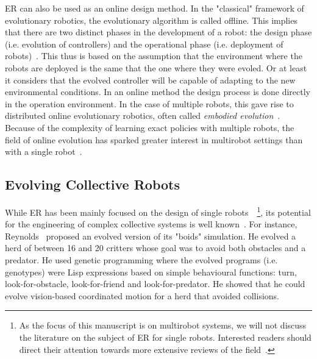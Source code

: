     ER can also be used as an online design method. In the "classical" framework of evolutionary robotics, the evolutionary algorithm is called offline. This implies that there are two distinct phases in the development of a robot: the design phase (i.e. evolution of controllers) and the operational phase (i.e. deployment of robots)~\parencite{Doncieux2015a, Francesca2016}. This thus is based on the assumption that the environment where the robots are deployed is the same that the one where they were evoled. Or at least it considers that the evolved controller will be capable of adapting to the new environmental conditions. In an online method the design process is done directly in the operation environment. In the case of multiple robots, this gave rise to distributed online evolutionary robotics, often called \emph{embodied evolution}~\parencite{Ficici1999, Watson2002}. Because of the complexity of learning exact policies with multiple robots, the field of online evolution has sparked greater interest in multirobot settings than with a single robot~\parencite{Doncieux2015a}.


  \subsection{Evolving Collective Robots}

    While ER has been mainly focused on the design of single robots~\parencite{Nolfi2000, Doncieux2015a}~\footnote{As the focus of this manuscript is on multirobot systems, we will not discuss the literature on the subject of ER for single robots. Interested readers should direct their attention towards more extensive reviews of the field~\parencite{Floreano2008, Bongard2013a, Trianni2014, Doncieux2015a}.}, its potential for the engineering of complex collective systems is well known~\parencite{Baldassarre2003}. For instance, Reynolds~\parencite{Reynolds1992} proposed an evolved version of its "boids" simulation. He evolved a herd of between 16 and 20 critters whose goal was to avoid both obstacles and a predator. He used genetic programming where the evolved programs (i.e. genotypes) were Lisp expressions based on simple behavioural functions: turn, look-for-obstacle, look-for-friend and look-for-predator. He showed that he could evolve vision-based coordinated motion for a herd that avoided collisions.

